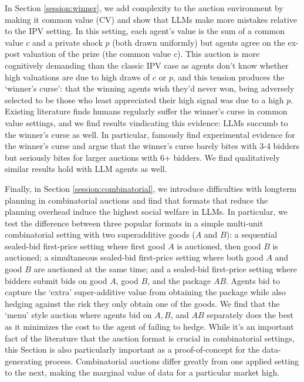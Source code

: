 \documentclass{article} %
\begin{document}
In Section \ref{session:winner}, we add complexity to the auction environment by making it common value (CV) and show that LLMs make more mistakes relative to the IPV setting. In this setting, each agent's value is the sum of a common value $c$ and a private shock $p$ (both drawn uniformly) but agents agree on the ex-post valuation of the prize (the common value $c$). This auction is more cognitively demanding than the classic IPV case as agents don't know whether high valuations are due to high draws of $c$ or $p$, and this tension produces the `winner's curse': that the winning agents wish they'd never won, being adversely selected to be those who least appreciated their high signal was due to a high $p$. Existing literature finds humans regularly suffer the winner's curse in common value settings, and we find results vindicating this evidence: LLMs succumb to the winner’s curse as well. 
In particular, \citet{kagel1986winner} famously find experimental evidence for the winner’s curse and argue that the winner’s curse barely bites with 3-4 bidders but seriously bites for larger auctions with 6+ bidders. We find qualitatively similar results hold with LLM agents as well.

Finally, in Section \ref{session:combinatorial}, we introduce difficulties with longterm planning in combinatorial auctions and find that formats that reduce the planning overhead induce the highest social welfare in LLMs. In particular, we test the difference between three popular formats in a simple multi-unit combinatorial setting with two superadditive goods ($A$ and $B$): a sequential sealed-bid first-price setting where first good $A$ is auctioned, then good $B$ is auctioned; a simultaneous sealed-bid first-price setting where both good $A$ and good $B$ are auctioned at the same time; and a sealed-bid first-price setting where bidders submit bids on good $A$, good $B$, and the package $AB$. Agents bid to capture the `extra' super-additive value from obtaining the package while also hedging against the risk they only obtain one of the goods. We find that the `menu' style auction where agents bid on $A, B$, and $AB$ separately does the best as it minimizes the cost to the agent of failing to hedge. While it's an important fact of the literature that the auction format is crucial in combinatorial settings, this Section is also particularly important as a proof-of-concept for the data-generating process. Combinatorial auctions differ greatly from one applied setting to the next, making the marginal value of data for a particular market high.
\end{document}
